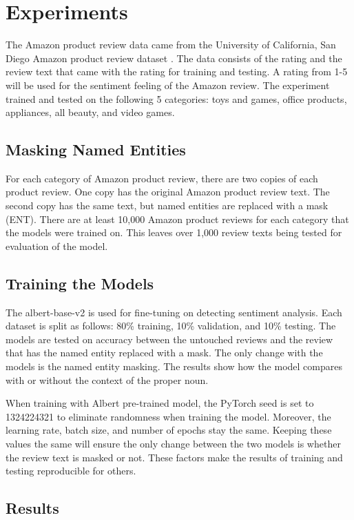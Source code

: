 \documentclass[11pt,a4paper]{article}
\begin{document}
\section{Experiments}

The Amazon product review data came from the University of California, San Diego Amazon product review dataset \cite{data}. The data consists of the rating and the review text that came with the rating for training and testing. A rating from 1-5 will be used for the sentiment feeling of the Amazon review. The experiment trained and tested on the following 5 categories: toys and games, office products, appliances, all beauty, and video games.

\subsection{Masking Named Entities}

For each category of Amazon product review, there are two copies of each product review. One copy has the original Amazon product review text. The second copy has the same text, but named entities are replaced with a mask (ENT). There are at least 10,000 Amazon product reviews for each category that the models were trained on. This leaves over 1,000 review texts being tested for evaluation of the model.

\subsection{Training the Models}

The albert-base-v2 is used for fine-tuning on detecting sentiment analysis. Each dataset is split as follows: 80\% training, 10\% validation, and 10\% testing. The models are tested on accuracy between the untouched reviews and the review that has the named entity replaced with a mask. The only change with the models is the named entity masking. The results show how the model compares with or without the context of the proper noun.

When training with Albert pre-trained model, the PyTorch seed is set to 1324224321 to eliminate randomness when training the model. Moreover, the learning rate, batch size, and number of epochs stay the same. Keeping these values the same will ensure the only change between the two models is whether the review text is masked or not. These factors make the results of training and testing reproducible for others. 

\subsection{Results}
\end{document}
